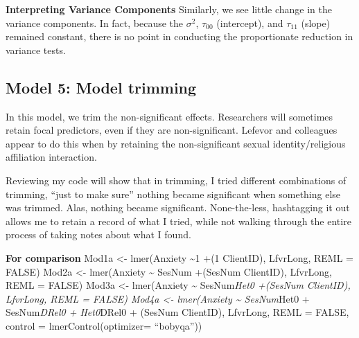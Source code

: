 \documentclass[
  english,
]{book}
\begin{document}
\textbf{Interpreting Variance Components}
Similarly, we see little change in the variance components. In fact, because the \(\sigma ^{2}\), \(\tau _{00}\) (intercept), and \(\tau _{11}\) (slope) remained constant, there is no point in conducting the proportionate reduction in variance tests.

\hypertarget{model-5-model-trimming}{%
\subsection{Model 5: Model trimming}\label{model-5-model-trimming}}

In this model, we trim the non-significant effects. Researchers will sometimes retain focal predictors, even if they are non-significant. Lefevor and colleagues \citep{lefevor_religious_2017} appear to do this when by retaining the non-significant sexual identity/religious affiliation interaction.

Reviewing my code will show that in trimming, I tried different combinations of trimming, ``just to make sure'' nothing became significant when something else was trimmed. Alas, nothing became significant. None-the-less, hashtagging it out allows me to retain a record of what I tried, while not walking through the entire process of taking notes about what I found.

\textbf{For comparison}
Mod1a \textless- lmer(Anxiety \textasciitilde1 +(1 \textbar{} ClientID), LfvrLong, REML = FALSE)
Mod2a \textless- lmer(Anxiety \textasciitilde{} SesNum +(SesNum \textbar{} ClientID), LfvrLong, REML = FALSE)
Mod3a \textless- lmer(Anxiety \textasciitilde{} SesNum\emph{Het0 +(SesNum \textbar{} ClientID), LfvrLong, REML = FALSE)
Mod4a \textless- lmer(Anxiety \textasciitilde{} SesNum}Het0 + SesNum\emph{DRel0 + Het0}DRel0 + (SesNum \textbar{} ClientID), LfvrLong, REML = FALSE, control = lmerControl(optimizer= ``bobyqa''))
\end{document}
